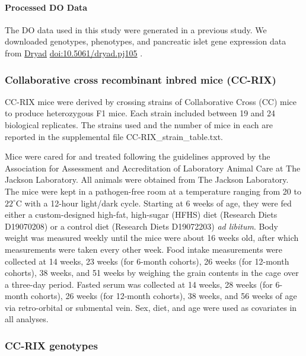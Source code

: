 \documentclass[
]{article}
\begin{document}
\paragraph{Processed DO Data}\label{processed-do-data}

The DO data used in this study were generated in a previous
study\cite{pmid31343992, pmid29567659}. We downloaded genotypes,
phenotypes, and pancreatic islet gene expression data from
\href{https://datadryad.org/}{Dryad}
\href{https://datadryad.org/dataset/doi:10.5061/dryad.pj105}{doi:10.5061/dryad.pj105}
\cite{DO_data}.

\subsubsection{Collaborative cross recombinant inbred mice
(CC-RIX)}\label{collaborative-cross-recombinant-inbred-mice-cc-rix}

CC-RIX mice were derived by crossing strains of Collaborative Cross (CC)
mice to produce heterozygous F1 mice. Each strain included between 19
and 24 biological replicates. The strains used and the number of mice in
each are reported in the supplemental file CC-RIX\_strain\_table.txt.

Mice were cared for and treated following the guidelines approved by the
Association for Assessment and Accreditation of Laboratory Animal Care
at The Jackson Laboratory. All animals were obtained from The Jackson
Laboratory. The mice were kept in a pathogen-free room at a temperature
ranging from 20 to \(22^{\circ}\)C with a 12-hour light/dark cycle.
Starting at 6 weeks of age, they were fed either a custom-designed
high-fat, high-sugar (HFHS) diet (Research Diets D19070208) or a control
diet (Research Diets D19072203) \textit{ad 
libitum}. Body weight was measured weekly until the mice were about 16
weeks old, after which measurements were taken every other week. Food
intake measurements were collected at 14 weeks, 23 weeks (for 6-month
cohorts), 26 weeks (for 12-month cohorts), 38 weeks, and 51 weeks by
weighing the grain contents in the cage over a three-day period. Fasted
serum was collected at 14 weeks, 28 weeks (for 6-month cohorts), 26
weeks (for 12-month cohorts), 38 weeks, and 56 weeks of age via
retro-orbital or submental vein. Sex, diet, and age were used as
covariates in all analyses.

\subsubsection{CC-RIX genotypes}\label{cc-rix-genotypes}
\end{document}
